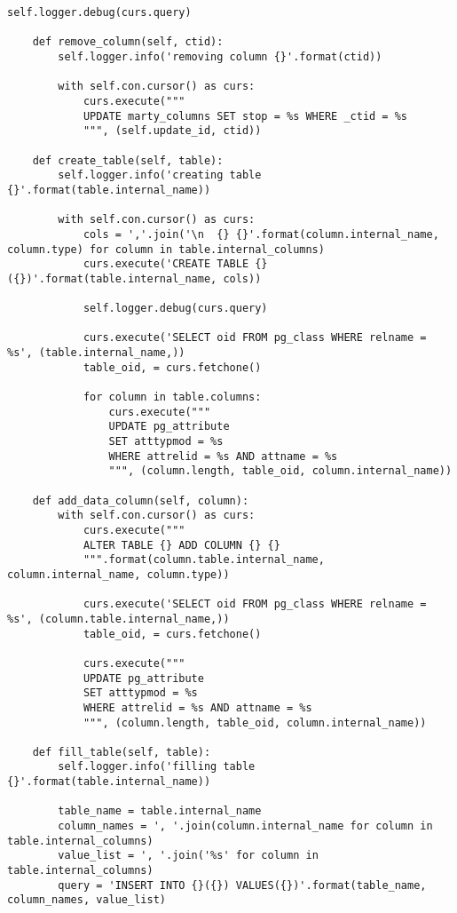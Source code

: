 \begin{lstlisting}[caption={utils/populator.py}]
            self.logger.debug(curs.query)

    def remove_column(self, ctid):
        self.logger.info('removing column {}'.format(ctid))

        with self.con.cursor() as curs:
            curs.execute("""
            UPDATE marty_columns SET stop = %s WHERE _ctid = %s
            """, (self.update_id, ctid))

    def create_table(self, table):
        self.logger.info('creating table {}'.format(table.internal_name))

        with self.con.cursor() as curs:
            cols = ','.join('\n  {} {}'.format(column.internal_name, column.type) for column in table.internal_columns)
            curs.execute('CREATE TABLE {}({})'.format(table.internal_name, cols))

            self.logger.debug(curs.query)

            curs.execute('SELECT oid FROM pg_class WHERE relname = %s', (table.internal_name,))
            table_oid, = curs.fetchone()

            for column in table.columns:
                curs.execute("""
                UPDATE pg_attribute
                SET atttypmod = %s
                WHERE attrelid = %s AND attname = %s
                """, (column.length, table_oid, column.internal_name))

    def add_data_column(self, column):
        with self.con.cursor() as curs:
            curs.execute("""
            ALTER TABLE {} ADD COLUMN {} {}
            """.format(column.table.internal_name, column.internal_name, column.type))

            curs.execute('SELECT oid FROM pg_class WHERE relname = %s', (column.table.internal_name,))
            table_oid, = curs.fetchone()

            curs.execute("""
            UPDATE pg_attribute
            SET atttypmod = %s
            WHERE attrelid = %s AND attname = %s
            """, (column.length, table_oid, column.internal_name))

    def fill_table(self, table):
        self.logger.info('filling table {}'.format(table.internal_name))

        table_name = table.internal_name
        column_names = ', '.join(column.internal_name for column in table.internal_columns)
        value_list = ', '.join('%s' for column in table.internal_columns)
        query = 'INSERT INTO {}({}) VALUES({})'.format(table_name, column_names, value_list)


\end{lstlisting}
